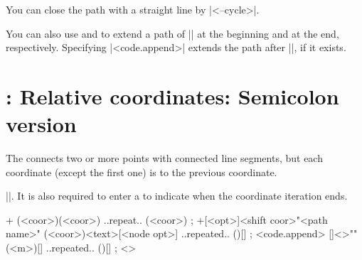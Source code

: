 You can close the path with a straight line by |<--cycle>|.

\begin{tzcode}{.3}
\end{tzcode}

You can also use \icmd{\tzlinesAtBegin} and \icmd{\tzlinesAtEnd} to extend a path of |\tzlines| at the beginning and at the end, respectively.
Specifying |<code.append>| extends the path after |\tzlinesAtEnd|, if it exists.

\begin{tzcode}{.3}
\end{tzcode}


\section{\protect\cmd{\tzlines+}: Relative coordinates: Semicolon version}
\label{s:tzlines+}

The  \icmd{\tzlines+} connects two or more points with connected line segments, but each coordinate (except the first one) is  to the previous coordinate. 

 |\tzlines|.
It is also required to enter a  to indicate when the coordinate iteration ends.


\begin{tzdef}
\tzlines+ (<coor>)(<coor>) ..repeat.. (<coor>) ;
\tzlines+[<opt>]<shift coor>"<path name>" 
         (<coor>){<text>}[<node opt>]
         ..repeated.. (){}[] ; <code.append>
  []<>"" (<m>){}[] ..repeated.. (){}[] ; <>
\end{tzdef}


